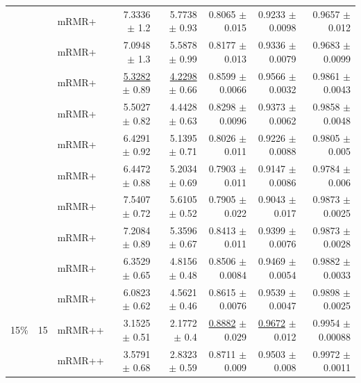 \begin{longtable}{llp{}rrrrr}
 &  & mRMR+ & 7.3336 {\scriptsize $\pm$ 1.2} & 5.7738 {\scriptsize $\pm$ 0.93} & 0.8065 {\scriptsize $\pm$ 0.015} & 0.9233 {\scriptsize $\pm$ 0.0098} & 0.9657 {\scriptsize $\pm$ 0.012} \\
 &  & mRMR+ & 7.0948 {\scriptsize $\pm$ 1.3} & 5.5878 {\scriptsize $\pm$ 0.99} & 0.8177 {\scriptsize $\pm$ 0.013} & 0.9336 {\scriptsize $\pm$ 0.0079} & 0.9683 {\scriptsize $\pm$ 0.0099} \\
 &  & mRMR+ & \underline{5.3282} {\scriptsize $\pm$ 0.89} & \underline{4.2298} {\scriptsize $\pm$ 0.66} & 0.8599 {\scriptsize $\pm$ 0.0066} & 0.9566 {\scriptsize $\pm$ 0.0032} & 0.9861 {\scriptsize $\pm$ 0.0043} \\
 &  & mRMR+ & 5.5027 {\scriptsize $\pm$ 0.82} & 4.4428 {\scriptsize $\pm$ 0.63} & 0.8298 {\scriptsize $\pm$ 0.0096} & 0.9373 {\scriptsize $\pm$ 0.0062} & 0.9858 {\scriptsize $\pm$ 0.0048} \\
 &  & mRMR+ & 6.4291 {\scriptsize $\pm$ 0.92} & 5.1395 {\scriptsize $\pm$ 0.71} & 0.8026 {\scriptsize $\pm$ 0.011} & 0.9226 {\scriptsize $\pm$ 0.0088} & 0.9805 {\scriptsize $\pm$ 0.005} \\
 &  & mRMR+ & 6.4472 {\scriptsize $\pm$ 0.88} & 5.2034 {\scriptsize $\pm$ 0.69} & 0.7903 {\scriptsize $\pm$ 0.011} & 0.9147 {\scriptsize $\pm$ 0.0086} & 0.9784 {\scriptsize $\pm$ 0.006} \\
 &  & mRMR+ & 7.5407 {\scriptsize $\pm$ 0.72} & 5.6105 {\scriptsize $\pm$ 0.52} & 0.7905 {\scriptsize $\pm$ 0.022} & 0.9043 {\scriptsize $\pm$ 0.017} & 0.9873 {\scriptsize $\pm$ 0.0025} \\
 &  & mRMR+ & 7.2084 {\scriptsize $\pm$ 0.89} & 5.3596 {\scriptsize $\pm$ 0.67} & 0.8413 {\scriptsize $\pm$ 0.011} & 0.9399 {\scriptsize $\pm$ 0.0076} & 0.9873 {\scriptsize $\pm$ 0.0028} \\
 &  & mRMR+ & 6.3529 {\scriptsize $\pm$ 0.65} & 4.8156 {\scriptsize $\pm$ 0.48} & 0.8506 {\scriptsize $\pm$ 0.0084} & 0.9469 {\scriptsize $\pm$ 0.0054} & 0.9882 {\scriptsize $\pm$ 0.0033} \\
 &  & mRMR+ & 6.0823 {\scriptsize $\pm$ 0.62} & 4.5621 {\scriptsize $\pm$ 0.46} & 0.8615 {\scriptsize $\pm$ 0.0076} & 0.9539 {\scriptsize $\pm$ 0.0047} & 0.9898 {\scriptsize $\pm$ 0.0025} \\
\midrule
15\% & 15 & mRMR++ & 3.1525 {\scriptsize $\pm$ 0.51} & 2.1772 {\scriptsize $\pm$ 0.4} & \underline{0.8882} {\scriptsize $\pm$ 0.029} & \underline{0.9672} {\scriptsize $\pm$ 0.012} & 0.9954 {\scriptsize $\pm$ 0.00088} \\
 &  & mRMR++ & 3.5791 {\scriptsize $\pm$ 0.68} & 2.8323 {\scriptsize $\pm$ 0.59} & 0.8711 {\scriptsize $\pm$ 0.009} & 0.9503 {\scriptsize $\pm$ 0.008} & 0.9972 {\scriptsize $\pm$ 0.0011} \\

\end{longtable}
